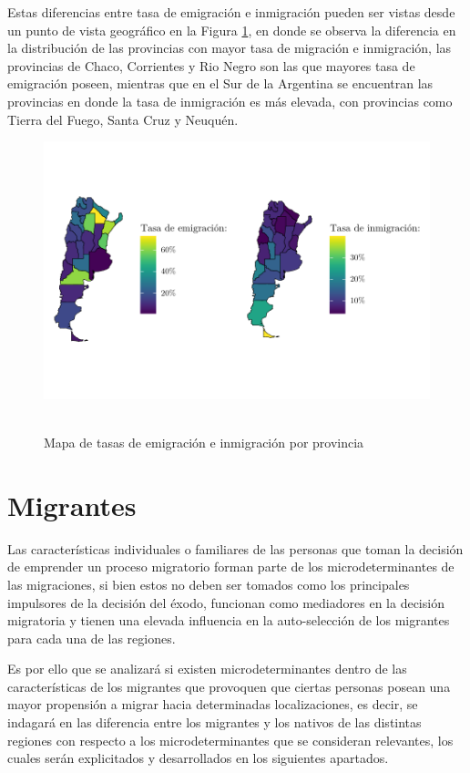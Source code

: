 \documentclass[12pt,a4paper]{article}
\begin{document}
Estas diferencias entre tasa de emigración e inmigración pueden ser vistas desde un punto de vista geográfico en la Figura \ref{figure:emig_inmig_prov_mapa}, en donde se observa la diferencia en la distribución de las provincias con mayor tasa de migración e inmigración, las provincias de Chaco, Corrientes y Rio Negro son las que mayores tasa de emigración poseen, mientras que en el Sur de la Argentina se encuentran las provincias en donde la tasa de inmigración es más elevada, con provincias como Tierra del Fuego, Santa Cruz y Neuquén.
\begin{figure}[h!]
\begin{center}
\caption{\\Mapa de tasas de emigración e inmigración por provincia}
\includegraphics[scale=1.1]{./graficos/emig_inmig_por_prov.pdf}
\label{figure:emig_inmig_prov_mapa}
\end{center}
\end{figure}
\newpage
\section{Migrantes}
Las características individuales o familiares de las personas que toman la decisión de emprender un proceso migratorio forman parte de los microdeterminantes de las migraciones, si bien estos no deben ser tomados como los principales impulsores de la decisión del éxodo, funcionan como mediadores en la decisión migratoria y tienen una elevada influencia en la auto-selección de los migrantes \parencite{borjas_self-selection_1987} para cada una de las regiones.

Es por ello que se analizará si existen microdeterminantes dentro de las características de los migrantes que provoquen que ciertas personas posean una mayor propensión a migrar hacia determinadas localizaciones, es decir, se indagará en las diferencia entre los migrantes y los nativos de las distintas regiones con respecto a los microdeterminantes que se consideran relevantes, los cuales serán explicitados y desarrollados en los siguientes apartados.
\end{document}

